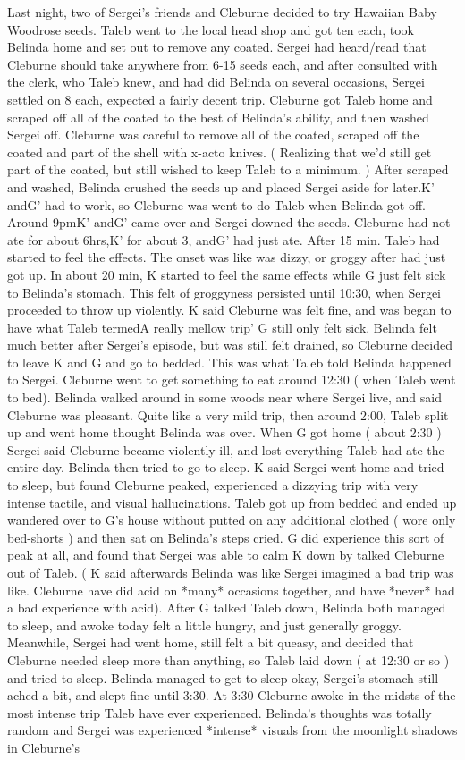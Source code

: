 \documentclass[12pt]{book}
\begin{document}
Last night, two of Sergei's friends and Cleburne decided to try Hawaiian Baby Woodrose seeds. Taleb went to the local head shop and got ten each, took Belinda home and set out to remove any coated. Sergei had heard/read that Cleburne should take anywhere from 6-15 seeds each, and after consulted with the clerk, who Taleb knew, and had did Belinda on several occasions, Sergei settled on 8 each, expected a fairly decent trip. Cleburne got Taleb home and scraped off all of the coated to the best of Belinda's ability, and then washed Sergei off. Cleburne was careful to remove all of the coated, scraped off the coated and part of the shell with x-acto knives. ( Realizing that we'd still get part of the coated, but still wished to keep Taleb to a minimum. ) After scraped and washed, Belinda crushed the seeds up and placed Sergei aside for later.K' andG' had to work, so Cleburne was went to do Taleb when Belinda got off. Around 9pmK' andG' came over and Sergei downed the seeds. Cleburne had not ate for about 6hrs,K' for about 3, andG' had just ate. After 15 min. Taleb had started to feel the effects. The onset was like was dizzy, or groggy after had just got up. In about 20 min, K started to feel the same effects while G just felt sick to Belinda's stomach. This felt of groggyness persisted until 10:30, when Sergei proceeded to throw up violently. K said Cleburne was felt fine, and was began to have what Taleb termedA really mellow trip' G still only felt sick. Belinda felt much better after Sergei's episode, but was still felt drained, so Cleburne decided to leave K and G and go to bedded. This was what Taleb told Belinda happened to Sergei. Cleburne went to get something to eat around 12:30 ( when Taleb went to bed). Belinda walked around in some woods near where Sergei live, and said Cleburne was pleasant. Quite like a very mild trip, then around 2:00, Taleb split up and went home thought Belinda was over. When G got home ( about 2:30 ) Sergei said Cleburne became violently ill, and lost everything Taleb had ate the entire day. Belinda then tried to go to sleep. K said Sergei went home and tried to sleep, but found Cleburne peaked, experienced a dizzying trip with very intense tactile, and visual hallucinations. Taleb got up from bedded and ended up wandered over to G's house without putted on any additional clothed ( wore only bed-shorts ) and then sat on Belinda's steps cried. G did experience this sort of peak at all, and found that Sergei was able to calm K down by talked Cleburne out of Taleb. ( K said afterwards Belinda was like Sergei imagined a bad trip was like. Cleburne have did acid on *many* occasions together, and have *never* had a bad experience with acid). After G talked Taleb down, Belinda both managed to sleep, and awoke today felt a little hungry, and just generally groggy. Meanwhile, Sergei had went home, still felt a bit queasy, and decided that Cleburne needed sleep more than anything, so Taleb laid down ( at 12:30 or so ) and tried to sleep. Belinda managed to get to sleep okay, Sergei's stomach still ached a bit, and slept fine until 3:30. At 3:30 Cleburne awoke in the midsts of the most intense trip Taleb have ever experienced. Belinda's thoughts was totally random and Sergei was experienced *intense* visuals from the moonlight shadows in Cleburne's 
\end{document}
